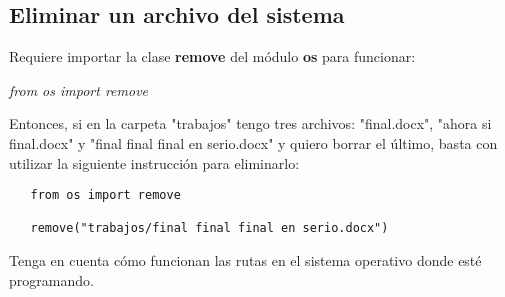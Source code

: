 \subsection{Eliminar un archivo del sistema}
\hspace{0.55cm}Requiere importar la clase \textbf{remove} del módulo \textbf{os} para funcionar:
\begin{center}
	\textit{from os import remove}
\end{center}

Entonces, si en la carpeta "trabajos" tengo tres archivos: "final.docx", "ahora si final.docx" y "final final final en serio.docx" y quiero borrar el último, basta con utilizar la siguiente instrucción para eliminarlo:
\begin{lstlisting}
   from os import remove
   
   remove("trabajos/final final final en serio.docx")
\end{lstlisting}

Tenga en cuenta cómo funcionan las rutas en el sistema operativo donde esté programando.